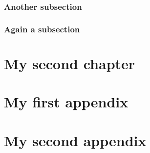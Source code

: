 \documentclass[%
	papersize=a4,%
	pagelayout=default,%
	fontname=latinmodern,%
	fontsize=11pt,%
	twoside,%
	final,%
	faculty=fpms%
]{umons-Thesis}%
\begin{document}
			
			\subsection{Another subsection}
			
				\lipsum[7-9]
			
			\subsection{Again a subsection}
			
				\blindtext
	
	
	\chapter{My second chapter}
	
		\Blindtext[16]
		
	
	\appendix
	\appendixpage
	
	
	\chapter{My first appendix}
	
		\Blindtext[8]
	
	\chapter{My second appendix}
	
		\Blindtext[8]


\backmatter
\end{document}
